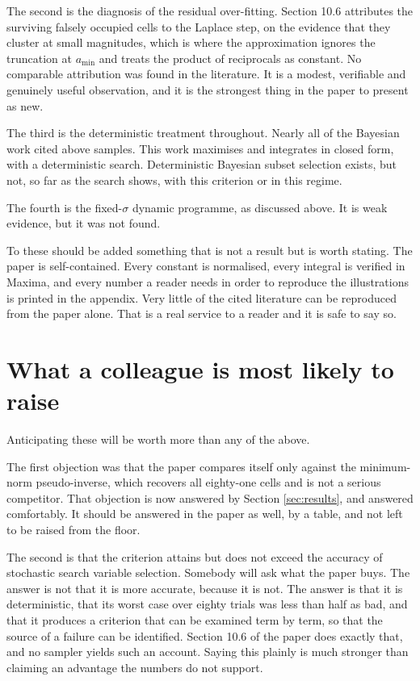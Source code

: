 The second is the diagnosis of the residual over-fitting. Section 10.6 attributes
the surviving falsely occupied cells to the Laplace step, on the evidence that they
cluster at small magnitudes, which is where the approximation ignores the
truncation at $a_{\min}$ and treats the product of reciprocals as constant. No
comparable attribution was found in the literature. It is a modest, verifiable and
genuinely useful observation, and it is the strongest thing in the paper to present
as new.

The third is the deterministic treatment throughout. Nearly all of the Bayesian
work cited above samples. This work maximises and integrates in closed form, with a
deterministic search. Deterministic Bayesian subset selection exists, but not, so
far as the search shows, with this criterion or in this regime.

The fourth is the fixed-$\sigma$ dynamic programme, as discussed above. It is weak
evidence, but it was not found.

To these should be added something that is not a result but is worth stating. The
paper is self-contained. Every constant is normalised, every integral is verified
in Maxima, and every number a reader needs in order to reproduce the illustrations
is printed in the appendix. Very little of the cited literature can be reproduced
from the paper alone. That is a real service to a reader and it is safe to say so.

\section{What a colleague is most likely to raise}

Anticipating these will be worth more than any of the above.

The first objection was that the paper compares itself only against the minimum-norm
pseudo-inverse, which recovers all eighty-one cells and is not a serious competitor.
That objection is now answered by Section \ref{sec:results}, and answered
comfortably. It should be answered in the paper as well, by a table, and not left to
be raised from the floor.

The second is that the criterion attains but does not exceed the accuracy of
stochastic search variable selection. Somebody will ask what the paper buys. The
answer is not that it is more accurate, because it is not. The answer is that it is
deterministic, that its worst case over eighty trials was less than half as bad, and
that it produces a criterion that can be examined term by term, so that the source
of a failure can be identified. Section 10.6 of the paper does exactly that, and no
sampler yields such an account. Saying this plainly is much stronger than claiming
an advantage the numbers do not support.

